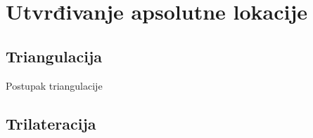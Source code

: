 


\section*{Utvrđivanje apsolutne lokacije}

\subsection*{Triangulacija}

Postupak triangulacije

\subsection*{Trilateracija}
